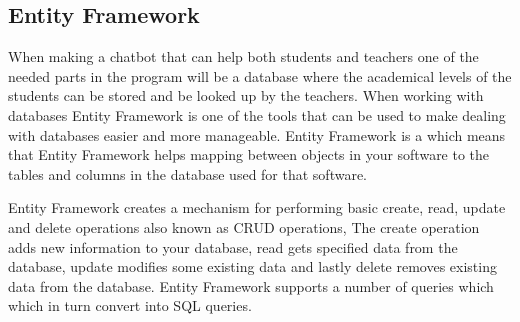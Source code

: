 \subsection{Entity Framework}
When making a chatbot that can help both students and teachers one of the needed parts in the program will be a database where the academical levels of the students can be stored and be looked up by the teachers. When working with databases Entity Framework is one of the tools that can be used to make dealing with databases easier and more manageable. Entity Framework is a  which means that Entity Framework helps mapping between objects in your software to the tables and columns in the database used for that software. 

Entity Framework creates a mechanism for performing basic create, read, update and delete operations also known as CRUD operations, The create operation adds new information to your database, read gets specified data from the database, update modifies some existing data and lastly delete removes existing data from the database. Entity Framework supports a number of queries which which in turn convert into SQL queries. 

